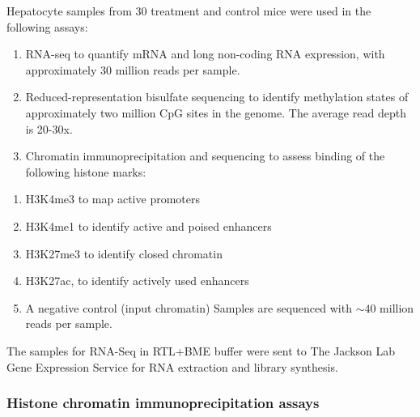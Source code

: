 \documentclass[10pt,letterpaper]{article}
\providecommand{\tightlist}{%
  \setlength{\itemsep}{0pt}\setlength{\parskip}{0pt}}
\begin{document}
Hepatocyte samples from 30 treatment and control mice were used in the
following assays:

\begin{enumerate}
\def\labelenumi{\arabic{enumi}.}
\tightlist
\item
  RNA-seq to quantify mRNA and long non-coding RNA expression, with
  approximately 30 million reads per sample.
\item
  Reduced-representation bisulfate sequencing to identify methylation
  states of approximately two million CpG sites in the genome. The
  average read depth is 20-30x.
\item
  Chromatin immunoprecipitation and sequencing to assess binding of the
  following histone marks:
\end{enumerate}

\begin{enumerate}
\def\labelenumi{\alph{enumi}.}
\tightlist
\item
  H3K4me3 to map active promoters
\item
  H3K4me1 to identify active and poised enhancers
\item
  H3K27me3 to identify closed chromatin
\item
  H3K27ac, to identify actively used enhancers
\item
  A negative control (input chromatin) Samples are sequenced with
  \(\sim40\) million reads per sample.
\end{enumerate}

The samples for RNA-Seq in RTL+BME buffer were sent to The Jackson Lab
Gene Expression Service for RNA extraction and library synthesis.

\hypertarget{histone-chromatin-immunoprecipitation-assays}{%
\subsubsection{Histone chromatin immunoprecipitation
assays}\label{histone-chromatin-immunoprecipitation-assays}}
\end{document}
